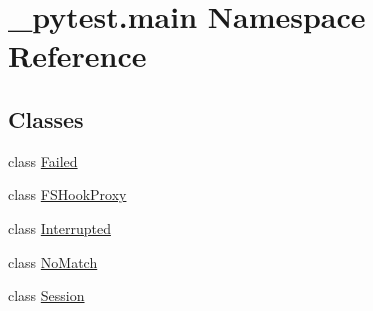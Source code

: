 \hypertarget{namespace__pytest_1_1main}{}\section{\+\_\+pytest.\+main Namespace Reference}
\label{namespace__pytest_1_1main}
\subsection*{Classes}
\begin{DoxyCompactItemize}
\item 
class \hyperlink{class__pytest_1_1main_1_1_failed}{Failed}
\item 
class \hyperlink{class__pytest_1_1main_1_1_f_s_hook_proxy}{F\+S\+Hook\+Proxy}
\item 
class \hyperlink{class__pytest_1_1main_1_1_interrupted}{Interrupted}
\item 
class \hyperlink{class__pytest_1_1main_1_1_no_match}{No\+Match}
\item 
class \hyperlink{class__pytest_1_1main_1_1_session}{Session}
\end{DoxyCompactItemize}
